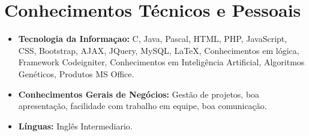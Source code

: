 \documentclass[11pt,a4paper,sans]{moderncv}        %
\begin{document}
\vspace{2pt}

\section{Conhecimentos Técnicos e Pessoais}

\vspace{6pt}

\begin{itemize}

\item \textbf{Tecnologia da Informaçao:} C, Java, Pascal, HTML, PHP, JavaScript, CSS, Bootstrap, AJAX, JQuery, MySQL, LaTeX, Conhecimentos em lógica, Framework Codeigniter, Conhecimentos em Inteligência Artificial, Algoritmos Genéticos, Produtos MS Office.

\vspace{6pt}







\item \textbf{Conhecimentos Gerais de Negócios:} Gestão de projetos, boa apresentação, facilidade com trabalho em equipe, boa comunicação.

\vspace{6pt}

\item \textbf{Línguas:} Inglês Intermediario.



\end{itemize}
\end{document}
